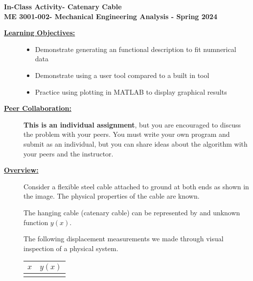 \documentclass[12pt]{article}
\newcommand{\COURNAME}{ME 3001-002}
\newcommand{\CURRTERM}{Spring 2024} %
\newcommand{\ANUM}{7} %
\newcommand{\activitytitle}{Catenary Cable} %
\begin{document}
\thispagestyle{plain}

\begin{center}
   {\bf \Large In-Class Activity\hspc\ANUM\hspc - \activitytitle}\vspace{3mm}\\
   {\bf \large \COURNAME - Mechanical Engineering Analysis - \CURRTERM} \vspace{5mm}\\
\end{center}

\begin{description}


\item[\textbf{\underline{Learning Objectives:}}] \hfill \vspace{0mm}

\begin{itemize}
	\item Demonstrate generating an functional description to fit numnerical data
	\item Demonstrate using a user tool compared to a built in tool
	\item Practice using plotting in MATLAB to display graphical results
\end{itemize}

\item[\textbf{\underline{Peer Collaboration:}}] \hfill \vspace{0mm}
	
	{\bf This is an individual assignment}, but you are encouraged to discuss the problem with your peers. You must write your own program and submit as an individual, but you can share ideas about the algorithm with your peers and the instructor.

\item[\textbf{\underline{Overview:}}] \hfill \vspace{0mm}


	Consider a flexible steel cable attached to ground at both ends as shown in the image. The physical properties of the cable are known. 

   The hanging cable (catenary cable) can be represented by and unknown function $y(x)$. 

   The following displacement measurements we made through visual inspection of a physical system.  


   \begin{tabular}{|c|c|} \hline
   $x$&$y(x)$ \\ \hline
   &\\ \hline 
   \end{tabular}




\end{description}
\end{document}
